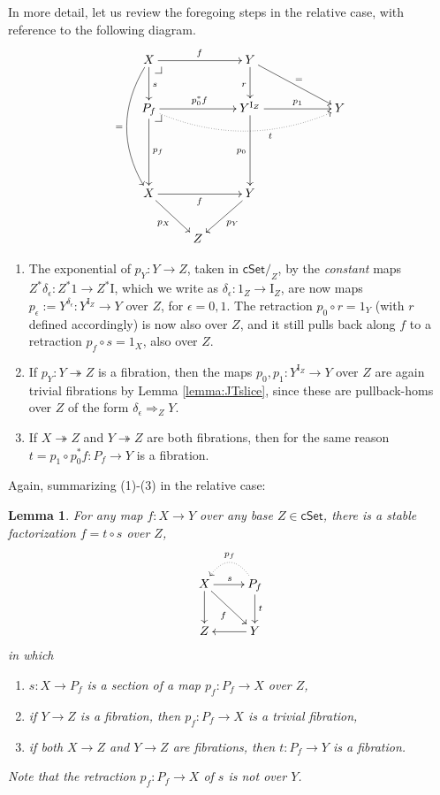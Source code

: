 \documentclass[11pt,reqno]{amsart}
\makeatletter
\newcommand{\cSet}{\ensuremath{\mathsf{cSet}}}
\newcommand{\cSetZ}{\ensuremath{\mathsf{cSet}/_{\!Z}}}
\newcommand{\ra}{\ensuremath{\rightarrow}}
\newcommand{\fib}{\ensuremath{\twoheadrightarrow}}
\renewcommand{\to}{\ensuremath{\rightarrow}}
\newcommand{\I}{\ensuremath{\mathrm{I}}}
\newtheorem{lemma}[theorem]{Lemma}
\theoremstyle{remark}
\theoremstyle{definition}
\newcommand{\pbcorner}[1][dr]{\save*!/#1-1.2pc/#1:(-1,1)@^{|-}\restore}
\makeatother
\begin{document}
In more detail, let us review the foregoing steps in the relative case, with reference to the following diagram.
\begin{equation}\label{diag:sliced_pathspace_factorization}
\xymatrix{
X \ar@/_1.5pc/[ddd]_= \ar[d]^s \ar[rr]^f \pbcorner && Y \ar[d]_r \ar[rrd]^=\\
P_f  \ar[dd]^{p_f} \ar[rr]^{p_0^*f} \ar@{.>}@/_1.5pc/[rrrr]_<<<<<<<<<<<<<<<t \pbcorner && Y^{\I_{Z}} \ar[dd]_{p_0} \ar[rr]^-{p_1} && Y \\
\\
X \ar[rd]_{p_X} \ar[rr]_f  && \ar[ld]^{p_Y} Y &\\
& Z &
}
\end{equation}
\begin{enumerate}

\item The exponential of $p_Y : Y\to Z$, taken in $\cSetZ$, by the \emph{constant} maps $Z^*\delta_\epsilon : Z^*1\to Z^*\I$, which we write as $\delta_\epsilon : 1_Z\to \I_Z$, are now maps $p_\epsilon := Y^{\delta_\epsilon} : Y^{\I_{Z}} \to Y$ over $Z$, for $\epsilon = 0,1$.  The retraction $p_0\circ r = 1_Y$ (with $r$ defined accordingly) is now also over $Z$, and it still pulls back along $f$ to a retraction $p_f \circ s =1_X$, also over $Z$.

\item If $p_Y : Y\fib Z$ is a fibration, then the maps $p_0 , p_1 : Y^{\I_Z} \ra Y$ over $Z$ are again trivial fibrations by Lemma \ref{lemma:JTslice}, since these are pullback-homs  over $Z$ of the form $\delta_\epsilon \Rightarrow_Z Y$. 
%

\item If $X\fib Z$ and $Y\fib Z$ are both fibrations, then for the same reason $t= p_1\circ p_0^*f : P_f \ra Y$ is a fibration. 
%
\end{enumerate}

Again, summarizing (1)-(3) in the relative case:

\begin{lemma}\label{lemma:relative_pathspace_factorization} 
For any map $f : X\ra Y$  over any base $Z\in \cSet$, 
there is a stable factorization $f = t\circ s$ over $Z$,
\begin{equation}\label{diag:pathspace_factorization4}
\xymatrix{
X \ar[d] \ar[r]^s \ar[rd]_f & \ar@{.>}@/_1.5pc/[l]_{p_f} P_f \ar[d]^t \\
Z & \ar[l] Y
}
\end{equation} 
in which
\begin{enumerate}
\item $s : X \to P_f$ is a section of a map $p_f : P_f \to X$ over $Z$,
\item  if $Y\to Z$ is a fibration, then $p_f : P_f \to X$ is a trivial fibration,
\item if both $X\to Z$ and $Y\to Z$ are fibrations, then $t : P_f \to Y$ is a fibration.
\end{enumerate}
Note that the retraction $p_f : P_f \ra X$ of $s$ is not over $Y$.
\end{lemma}
\end{document}
